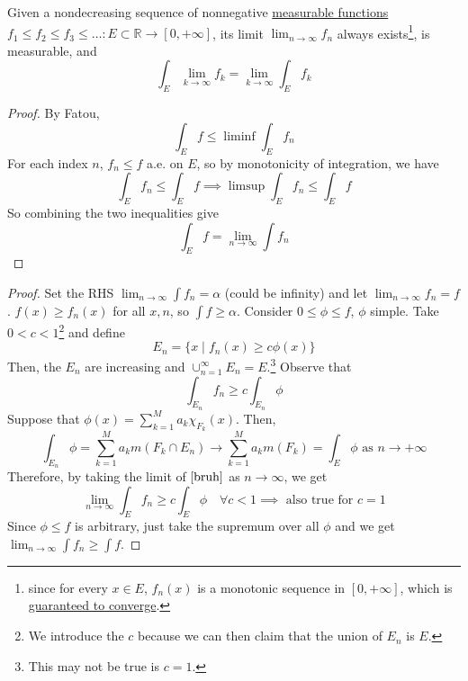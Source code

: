   \begin{theorem}
    \label{thm:monotone-convergene-theorem-mct}
    Given a nondecreasing sequence of nonnegative \hyperref[def:measurable-function]{measurable functions} $f_1 \leq f_2 \leq f_3 \leq \ldots : E \subset \mathbb{R} \to [0, +\infty]$, its limit $\lim_{n \rightarrow \infty} f_n$ always exists\footnote{since for every $x \in E$, $f_n(x)$ is a monotonic sequence in $[0, +\infty]$, which is \hyperref[real-thm:monotone-convergence]{guaranteed to converge}.}, is measurable, and 
    \begin{equation}
      \int_E \lim_{k \rightarrow \infty} f_k = \lim_{k \rightarrow \infty} \int_E f_k
    \end{equation}
  \end{theorem}
  \begin{proof}
    By Fatou, 
    \begin{equation}
      \int_E f \leq \liminf \int_E f_n
    \end{equation}
    For each index $n$, $f_n \leq f$ a.e. on $E$, so by monotonicity of integration, we have 
    \begin{equation}
      \int_E f_n \leq \int_E f \implies \limsup \int_E f_n \leq \int_E f
    \end{equation}
    So combining the two inequalities give 
    \begin{equation}
      \int_E f = \lim_{n \to \infty} \int f_n
    \end{equation}
  \end{proof}
  \begin{proof}
    Set the RHS $\lim_{n \to \infty} \int f_n = \alpha$ (could be infinity) and let $\lim_{n \to \infty} f_n = f$. $f(x) \geq f_n (x)$ for all $x, n$, so $\int f \geq \alpha$. Consider $0 \leq \phi \leq f$, $\phi$ simple. Take $0 < c < 1$\footnote{We introduce the $c$ because we can then claim that the union of $E_n$ is $E$.} and define 
    \begin{equation}
      E_n = \{ x \mid f_n (x) \geq c \phi(x) \} 
    \end{equation} 
    Then, the $E_n$ are increasing and $\cup_{n=1}^\infty E_n = E$.\footnote{This may not be true is $c = 1$.} Observe that 
    \begin{equation}
      \label{bruh}
      \int_{E_n} f_n \geq c \int_{E_n} \phi  
    \end{equation}
    Suppose that $\phi (x) = \sum_{k=1}^M a_k \chi_{F_k} (x)$. Then, 
    \begin{equation}
      \int_{E_n} \phi = \sum_{k=1}^M a_k m(F_k \cap E_n) \to \sum_{k=1}^M a_k m(F_k) = \int_E \phi \text{ as } n \to +\infty
    \end{equation} 
    Therefore, by taking the limit of $\ref{bruh}$ as $n \to \infty$, we get 
    \begin{equation}
      \lim_{n \to \infty} \int_E f_n \geq c \int_E \phi \quad \forall c < 1 \implies \text{ also true for } c = 1
    \end{equation}
    Since $\phi \leq f$ is arbitrary, just take the supremum over all $\phi$ and we get $\lim_{n \to \infty} \int f_n \geq \int f $. 
  \end{proof}

